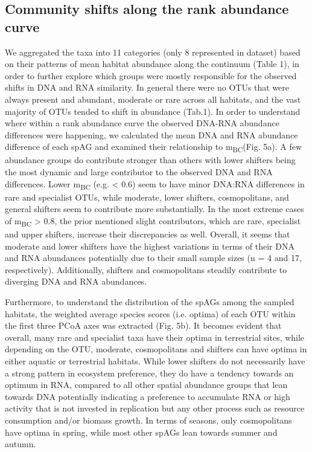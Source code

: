 \documentclass[12pt,a4paper]{article} %
\begin{document}
\subsection*{Community shifts along the rank abundance curve}
We aggregated the taxa into 11 categories (only 8 represented in dataset) based on their patterns of mean habitat abundance along the continuum (Table 1), in order to further explore which groups were mostly responsible for the observed shifts in DNA and RNA similarity. In general there were no OTUs that were always present and abundant, moderate or rare across all habitats, and the vast majority of OTUs tended to shift in abundance (Tab.1). In order to understand where within a rank abundance curve the observed DNA-RNA abundance differences were happening, we calculated the mean DNA and RNA abundance difference of each spAG and examined their relationship to m\textsubscript{BC}(Fig. 5a). A few abundance groups do contribute stronger than others with lower shifters being the most dynamic and large contributor to the observed DNA and RNA differences. Lower m\textsubscript{BC} (e.g. < 0.6) seem to have minor DNA:RNA differences in rare and specialist OTUs, while moderate, lower shifters, cosmopolitans, and general shifters seem to contribute more substantially. In the most extreme cases of m\textsubscript{BC} > 0.8, the prior mentioned slight contributors, which are rare, specialist and upper shifters, increase their discrepancies as well. Overall, it seems that moderate and lower shifters have the highest variations in terms of their DNA and RNA abundances potentially due to their small sample sizes (n = 4 and 17, respectively). Additionally, shifters and cosmopolitans steadily contribute to diverging DNA and RNA abundances.

Furthermore, to understand the distribution of the spAGs among the sampled habitats, the weighted average species scores (i.e. optima) of each OTU within the first three PCoA axes was extracted (Fig. 5b). It becomes evident that overall, many rare and specialist taxa have their optima in terrestrial sites, while depending on the OTU, moderate, cosmopolitans and shifters can have optima in either aquatic or terrestrial habitats. While lower shifters do not necessarily have a strong pattern in ecosystem preference, they do have a tendency towards an optimum in RNA, compared to all other spatial abundance groups that lean towards DNA potentially indicating a preference to accumulate RNA or high activity that is not invested in replication but any other process such as resource consumption and/or biomass growth. In terms of seasons, only cosmopolitans have optima in spring, while most other spAGs lean towards summer and autumn.
\end{document}
